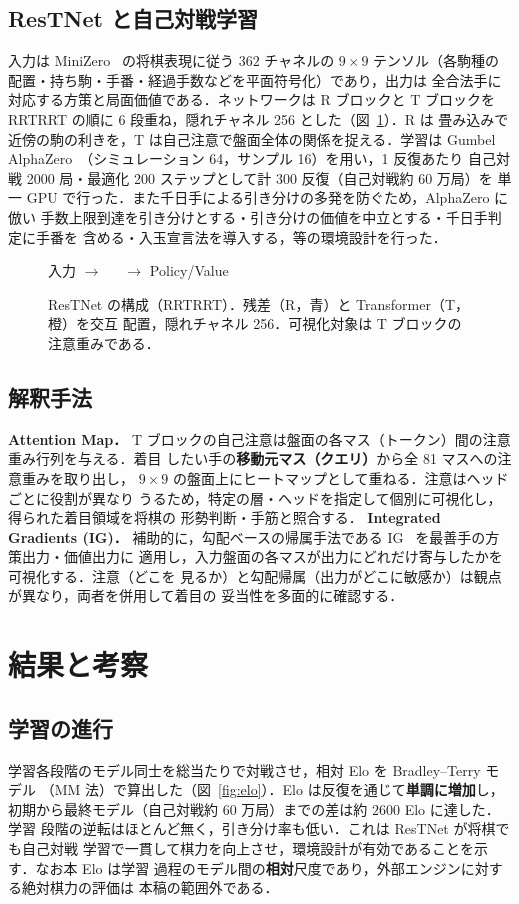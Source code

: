 \documentclass[a4paper,10pt,twocolumn]{ltjsarticle}
\newcommand{\rblk}{\colorbox{blue!15}{\makebox[2.6ex]{\textbf{R}}}}
\newcommand{\tblk}{\colorbox{orange!35}{\makebox[2.6ex]{\textbf{T}}}}
\begin{document}
\subsection{ResTNet と自己対戦学習}
入力は MiniZero~\cite{minizero} の将棋表現に従う $362$ チャネルの $9\times9$
テンソル（各駒種の配置・持ち駒・手番・経過手数などを平面符号化）であり，出力は
全合法手に対応する方策と局面価値である．ネットワークは R ブロックと T ブロックを
RRTRRT の順に 6 段重ね，隠れチャネル 256 とした（図~\ref{fig:arch}）．R は
畳み込みで近傍の駒の利きを，T は自己注意で盤面全体の関係を捉える．学習は Gumbel
AlphaZero~\cite{gumbel}（シミュレーション 64，サンプル 16）を用い，1 反復あたり
自己対戦 2000 局・最適化 200 ステップとして計 300 反復（自己対戦約 60 万局）を
単一 GPU で行った．また千日手による引き分けの多発を防ぐため，AlphaZero に倣い
手数上限到達を引き分けとする・引き分けの価値を中立とする・千日手判定に手番を
含める・入玉宣言法を導入する，等の環境設計を行った．

\begin{figure}[t]
  \centering
  入力 $\rightarrow$
  \rblk\,\rblk\,\tblk\,\rblk\,\rblk\,\tblk
  $\rightarrow$ Policy/Value
  \caption{ResTNet の構成（RRTRRT）．残差（R，青）と Transformer（T，橙）を交互
    配置，隠れチャネル 256．可視化対象は T ブロックの注意重みである．}
  \label{fig:arch}
\end{figure}

\subsection{解釈手法}
\textbf{Attention Map．}\quad
T ブロックの自己注意は盤面の各マス（トークン）間の注意重み行列を与える．着目
したい手の\textbf{移動元マス（クエリ）}から全 81 マスへの注意重みを取り出し，
$9\times9$ の盤面上にヒートマップとして重ねる．注意はヘッドごとに役割が異なり
うるため，特定の層・ヘッドを指定して個別に可視化し，得られた着目領域を将棋の
形勢判断・手筋と照合する．
\textbf{Integrated Gradients (IG)．}\quad
補助的に，勾配ベースの帰属手法である IG~\cite{ig} を最善手の方策出力・価値出力に
適用し，入力盤面の各マスが出力にどれだけ寄与したかを可視化する．注意（どこを
見るか）と勾配帰属（出力がどこに敏感か）は観点が異なり，両者を併用して着目の
妥当性を多面的に確認する．

\section{結果と考察}
\subsection{学習の進行}
学習各段階のモデル同士を総当たりで対戦させ，相対 Elo を Bradley--Terry モデル
（MM 法）で算出した（図~\ref{fig:elo}）．Elo は反復を通じて\textbf{単調に増加}し，
初期から最終モデル（自己対戦約 60 万局）までの差は約 $2600$ Elo に達した．学習
段階の逆転はほとんど無く，引き分け率も低い．これは ResTNet が将棋でも自己対戦
学習で一貫して棋力を向上させ，環境設計が有効であることを示す．なお本 Elo は学習
過程のモデル間の\textbf{相対}尺度であり，外部エンジンに対する絶対棋力の評価は
本稿の範囲外である．
\end{document}
